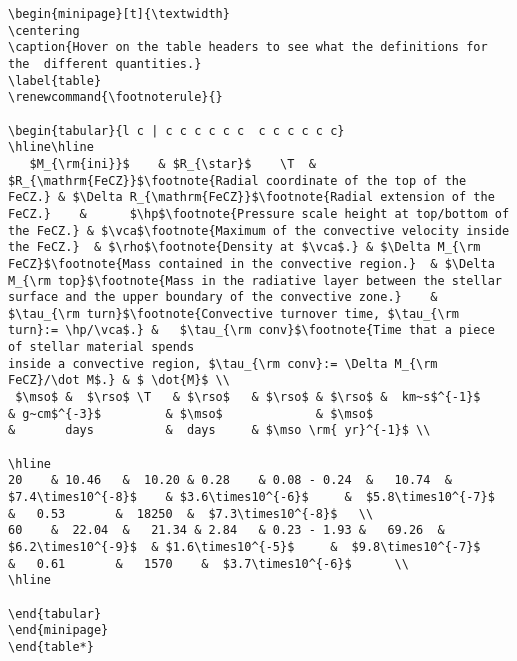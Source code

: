 \begin{verbatim}
\begin{minipage}[t]{\textwidth}
\centering
\caption{Hover on the table headers to see what the definitions for the  different quantities.}
\label{table}
\renewcommand{\footnoterule}{}

\begin{tabular}{l c | c c c c c c  c c c c c c}
\hline\hline
   $M_{\rm{ini}}$    & $R_{\star}$    \T  & $R_{\mathrm{FeCZ}}$\footnote{Radial coordinate of the top of the FeCZ.} & $\Delta R_{\mathrm{FeCZ}}$\footnote{Radial extension of the FeCZ.}    &      $\hp$\footnote{Pressure scale height at top/bottom of the FeCZ.} & $\vca$\footnote{Maximum of the convective velocity inside the FeCZ.}  & $\rho$\footnote{Density at $\vca$.} & $\Delta M_{\rm FeCZ}$\footnote{Mass contained in the convective region.}  & $\Delta M_{\rm top}$\footnote{Mass in the radiative layer between the stellar surface and the upper boundary of the convective zone.}    & $\tau_{\rm turn}$\footnote{Convective turnover time, $\tau_{\rm turn}:= \hp/\vca$.} &   $\tau_{\rm conv}$\footnote{Time that a piece of stellar material spends 
inside a convective region, $\tau_{\rm conv}:= \Delta M_{\rm FeCZ}/\dot M$.} & $ \dot{M}$ \\
 $\mso$ &  $\rso$ \T   & $\rso$   & $\rso$ & $\rso$ &  km~s$^{-1}$     & g~cm$^{-3}$         & $\mso$             & $\mso$                            &       days          &  days     & $\mso \rm{ yr}^{-1}$ \\

\hline
20    & 10.46   &  10.20 & 0.28    & 0.08 - 0.24  &   10.74  &  $7.4\times10^{-8}$    & $3.6\times10^{-6}$     &  $5.8\times10^{-7}$       &   0.53       &  18250  &  $7.3\times10^{-8}$   \\
60    &  22.04  &   21.34 & 2.84   & 0.23 - 1.93 &   69.26  &    $6.2\times10^{-9}$  & $1.6\times10^{-5}$     &  $9.8\times10^{-7}$     &   0.61       &   1570    &  $3.7\times10^{-6}$      \\
\hline

\end{tabular}
\end{minipage}
\end{table*} 
\end{verbatim}